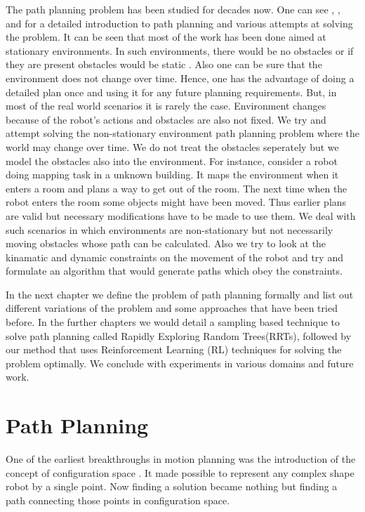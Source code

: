 \documentclass[MTech]{iitmdiss}
\begin{document}
 
The path planning problem has been studied for decades now. One can see \cite{choset05}, \cite{deberg00} , \cite{latombe91}  and \cite{lav06} for a detailed introduction to path planning and various attempts at solving the problem. It can be seen that most of the work has been done aimed at stationary environments. In such environments, there would  be no obstacles or if they are present obstacles would be static . Also one can be sure that the environment does not change over time. Hence, one has the advantage of doing a detailed plan once and using it for any future planning requirements. But, in most of the real world scenarios it is rarely the case. Environment changes because of the robot's actions and obstacles are also not fixed. We try and attempt solving the non-stationary environment path planning problem where the world may change over time. We do not treat the obstacles seperately but we model the obstacles also into the environment. For instance, consider a robot doing mapping task in a unknown building. It maps the environment when it enters a room and plans a way to get out of the room. The next time when the robot enters the room some objects might have been moved. Thus earlier plans are valid but necessary modifications have to be made to use them. We deal with such scenarios in which environments are non-stationary but not necessarily moving obstacles whose path can be calculated. Also we try to look at the kinamatic and dynamic constraints on the movement of the robot and try and formulate an algorithm that would generate paths which obey the constraints.

In the next chapter we define the problem of path planning formally and list out different variations of the problem and some approaches that have been tried before. In the further chapters we would detail a sampling based technique to solve path planning called Rapidly Exploring Random Trees(RRTs), followed by our method that uses Reinforcement Learning (RL) techniques for solving the problem optimally. We conclude with experiments in various domains and future work.

\chapter{Path Planning}

One of the earliest breakthroughs in motion planning was the introduction of the concept of configuration space \cite{perez79}.  It made possible to represent any complex shape robot by a single point. Now finding a solution became nothing but finding a path connecting those points in configuration space. 
\end{document}
